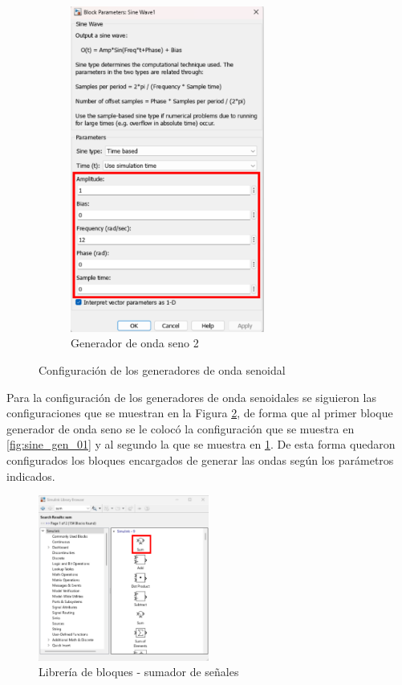 \begin{figure}[htbp]
\begin{subfigure}[b]{0.45\textwidth}
        \includegraphics[width=0.7\textwidth]{fig/especifico_2/CASO_ESTUDIO_FILTRO/sinewave_2.pdf}
        \caption{Generador de onda seno 2}
        \label{fig:sine_gen_02}
    \end{subfigure}
    \caption{Configuración de los generadores de onda senoidal}
    \label{fig:sine_wave_generators_config}
\end{figure}

Para la configuración de los generadores de onda senoidales se siguieron las configuraciones que se muestran en la Figura \ref{fig:sine_wave_generators_config}, de forma que al primer bloque generador de onda seno se le colocó la configuración que se muestra en \ref{fig:sine_gen_01} y al segundo la que se muestra en \ref{fig:sine_gen_02}. De esta forma quedaron configurados los bloques encargados de generar las ondas según los parámetros indicados.


\begin{figure}[h!]
    \centering
    \includegraphics[width=0.5\textwidth]{fig/especifico_2/CASO_ESTUDIO_FILTRO/sum_0.pdf}
    \caption{Librería de bloques - sumador de señales}
    \label{fig:lib_bloq_sum}
\end{figure}

